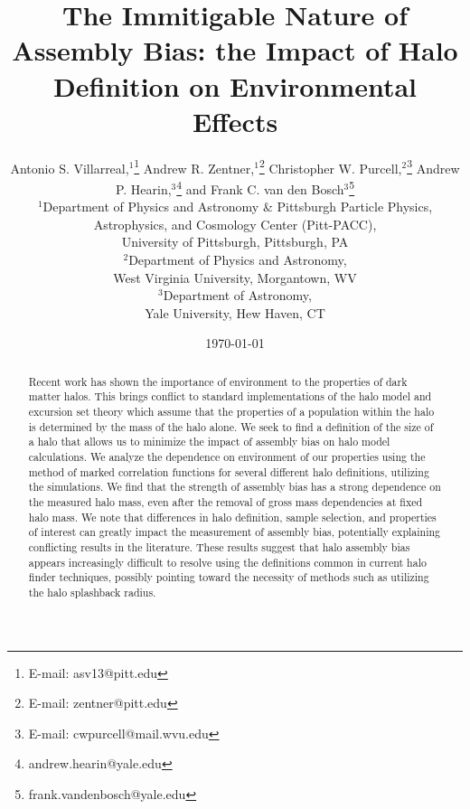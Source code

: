 \documentclass[usenatbib]{mnras}
\begin{document}
\title[The Immitigable Nature of Assembly Bias]{The Immitigable Nature of Assembly
Bias: the Impact of Halo Definition on Environmental Effects}
\author[A. Villarreal et al.]{
Antonio S. Villarreal,$^{1}$\thanks{E-mail: asv13@pitt.edu}
Andrew R. Zentner,$^{1}$\thanks{E-mail: zentner@pitt.edu}
Christopher W. Purcell,$^{2}$\thanks{E-mail: cwpurcell@mail.wvu.edu}
\newauthor
Andrew P. Hearin,$^{3}$\thanks{andrew.hearin@yale.edu}
and Frank C. van den Bosch$^{3}$\thanks{frank.vandenbosch@yale.edu} 
\\
$^{1}$Department of Physics and Astronomy \& Pittsburgh Particle Physics,\\ Astrophysics, and Cosmology Center (Pitt-PACC), \\
University of Pittsburgh, Pittsburgh, PA\\
$^{2}$Department of Physics and Astronomy, \\
West Virginia University, Morgantown, WV \\
$^{3}$Department of Astronomy, \\
Yale University, Hew Haven, CT}

\date{\today}



\maketitle

\begin{abstract}
Recent work has shown the importance of environment to the properties of dark matter halos. This brings conflict
to standard implementations of the halo model and excursion set theory which assume that the properties of a
population within the halo is determined by the mass of the halo alone. We seek to find a definition of the size
of a halo that allows us to minimize the impact of assembly bias on halo model calculations. We analyze the
dependence on environment of our properties using the method of marked correlation functions for several
different halo definitions, utilizing the \citet{diemer_kravtsov15} simulations. We find that the strength of assembly
bias has a strong dependence on the measured halo mass, even after the removal of gross mass dependencies at fixed
halo mass. We note that differences in halo definition, sample selection, and properties of interest can greatly impact
the measurement of assembly bias, potentially explaining conflicting results in the literature. These results suggest that
halo assembly bias appears increasingly difficult to resolve using the definitions common in current halo finder techniques,
possibly pointing toward the necessity of methods such as utilizing the halo splashback radius.
\end{abstract}
\end{document}
